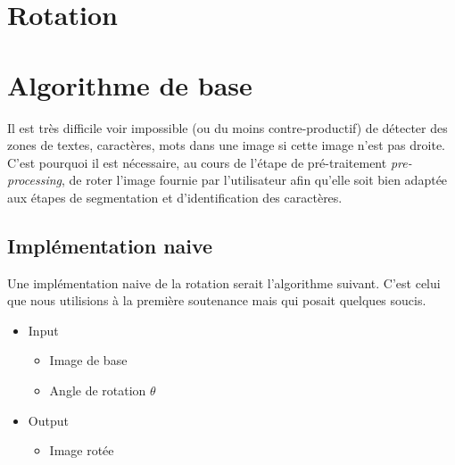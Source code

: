 \section{Rotation}
\section{Algorithme de base}

Il est très difficile voir impossible (ou du moins contre-productif) de
détecter des zones de textes, caractères, mots dans une image si cette image
n'est pas droite. C'est pourquoi il est nécessaire, au cours de l'étape de
pré-traitement \emph{pre-processing}, de roter l'image fournie par l'utilisateur
afin qu'elle soit bien adaptée aux étapes de segmentation et d'identification
des caractères. \\

\subsection{Implémentation naive}

Une implémentation naive de la rotation serait l'algorithme suivant. C'est
celui que nous utilisions à la première soutenance mais qui posait quelques
soucis. \\

\begin{itemize}
  \item{Input} \\
    \begin{itemize}
      \item Image de base
      \item Angle de rotation $\theta$
    \end{itemize}
  \item{Output}
    \begin{itemize}
      \item Image rotée
    \end{itemize}
\end{itemize}

